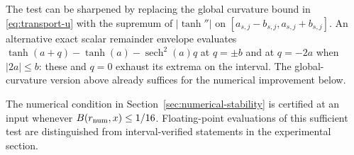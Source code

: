 The test can be sharpened by replacing the global curvature bound in
\eqref{eq:transport-u} with the supremum of $|\tanh''|$ on
$[a_{s,j}-b_{s,j},a_{s,j}+b_{s,j}]$. An alternative exact scalar remainder
envelope evaluates
$\tanh(a+q)-\tanh(a)-\operatorname{sech}^2(a)q$
at $q=\pm b$ and at $q=-2a$ when $|2a|\le b$: these and $q=0$ exhaust
its extrema on the interval. The global-curvature version above already
suffices for the numerical improvement below.


The numerical condition in Section~\ref{sec:numerical-stability} is certified at an input whenever $B(r_{\rm num},x)\le1/16$. Floating-point evaluations of this sufficient test are distinguished from interval-verified statements in the experimental section.
